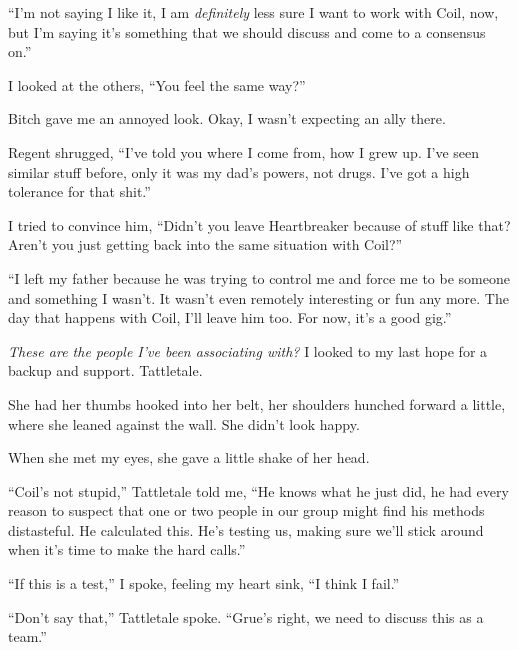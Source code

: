 ``I'm not saying I like it, I am \emph{definitely }less sure I want to work with Coil, now, but I'm saying it's something that we should discuss and come to a consensus on.''



I looked at the others, ``You feel the same way?''



Bitch gave me an annoyed look.  Okay, I wasn't expecting an ally there.



Regent shrugged, ``I've told you where I come from, how I grew up.  I've seen similar stuff before, only it was my dad's powers, not drugs.  I've got a high tolerance for that shit.''



I tried to convince him, ``Didn't you leave Heartbreaker because of stuff like that?  Aren't you just getting back into the same situation with Coil?''



``I left my father because he was trying to control me and force me to be someone and something I wasn't.  It wasn't even remotely interesting or fun any more.  The day that happens with Coil, I'll leave him too.  For now, it's a good gig.''



\emph{These are the people I've been associating with?}  I looked to my last hope for a backup and support.  Tattletale.



She had her thumbs hooked into her belt, her shoulders hunched forward a little, where she leaned against the wall.  She didn't look happy.



When she met my eyes, she gave a little shake of her head.



``Coil's not stupid,'' Tattletale told me, ``He knows what he just did, he had every reason to suspect that one or two people in our group might find his methods distasteful.  He calculated this.  He's testing us, making sure we'll stick around when it's time to make the hard calls.''



``If this is a test,'' I spoke, feeling my heart sink, ``I think I fail.''



``Don't say that,'' Tattletale spoke.  ``Grue's right, we need to discuss this as a team.''




